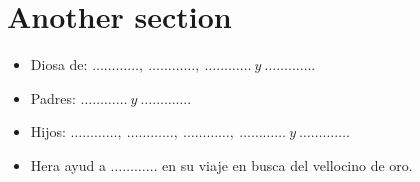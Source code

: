 \documentclass[11pt,letterpaper,final,onecolumn]{article}
\begin{document}
\section{Another section}
\begin{itemize}
 \item Diosa de: $\dots\dots\dots\dots,\ \dots\dots\dots\dots,\ \dots\dots\dots\dots\ y\ \dots\dots\dots\dots$.
 \item Padres: $\dots\dots\dots\dots\ y\ \dots\dots\dots\dots$.
 \item Hijos: $\dots\dots\dots\dots,\ \dots\dots\dots\dots,\ \dots\dots\dots\dots,\ \dots\dots\dots\dots\ y\ \dots\dots\dots\dots$.
 \item Hera ayud a $\dots\dots\dots\dots$ en su viaje en busca del vellocino de oro.
\end{itemize}
\end{document}
